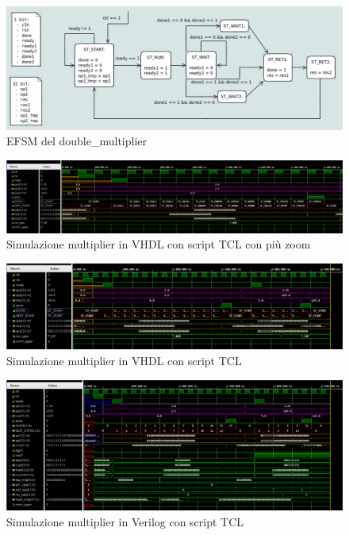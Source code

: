 \documentclass[]{IEEEtran}
\begin{document}
\begin{figure}[bt]
    \centering
    \includegraphics[width=\textwidth]{figures/EFSM_dm}
    \caption{EFSM del double\_multiplier}
    \label{fig:EFSM_DM}
\end{figure}

\begin{figure}[bt]
    \centering
    \includegraphics[width=\textwidth]{figures/sim_mult_vhdl_zoom}
    \caption{Simulazione multiplier in VHDL con script TCL con più zoom}
    \label{fig:SIM_MULT_VHDL_ZOOM}
\end{figure}

\begin{figure}[bt]
    \centering
    \includegraphics[width=\textwidth]{figures/sim_mult_vhdl}
    \caption{Simulazione multiplier in VHDL con script TCL}
    \label{fig:SIM_MULT_VHDL}
\end{figure}

\begin{figure}[bt]
    \centering
    \includegraphics[width=\textwidth]{figures/sim_mult_verilog}
    \caption{Simulazione multiplier in Verilog con script TCL}
    \label{fig:SIM_MULT_VERILOG}
\end{figure}
\end{document}
